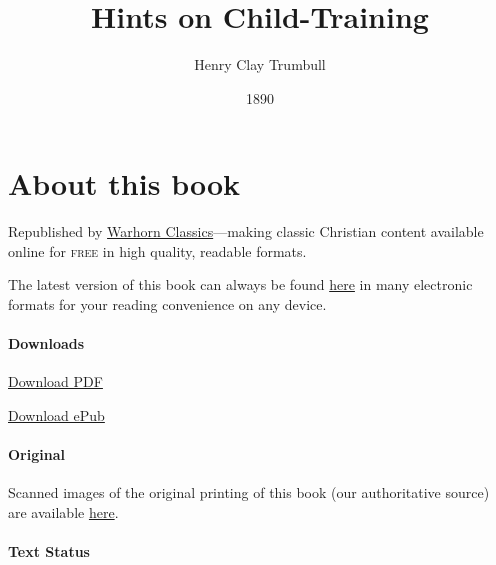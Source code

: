 \documentclass[
]{book}
\title{Hints on Child-Training}
\author{Henry Clay Trumbull}
\date{1890}
\begin{document}
\maketitle

\mainmatter
{}

{
\setcounter{tocdepth}{1}
\tableofcontents
}
\hypertarget{about-this-book}{%
\chapter*{About this book}\label{about-this-book}}

Republished by \href{https://classics.warhornmedia.com/}{Warhorn Classics}---making classic Christian content available online for \textsc{free} in high quality, readable formats.

The latest version of this book can always be found \href{https://warhornmedia.github.io/child-training-trumbull/}{here} in many electronic formats for your reading convenience on any device.

\hypertarget{downloads}{%
\subsubsection*{Downloads}\label{downloads}}

\href{https://warhornmedia.github.io/child-training-trumbull//Trumbull-Hints_on_Child_Training.pdf}{Download PDF}

\href{https://warhornmedia.github.io/child-training-trumbull//Trumbull-Hints_on_Child_Training.epub}{Download ePub}

\hypertarget{original}{%
\subsubsection*{Original}\label{original}}

Scanned images of the original printing of this book (our authoritative source) are available \href{https://archive.org/details/hintsonchildtrai00trum}{here}.

\hypertarget{text-status}{%
\subsubsection*{Text Status}\label{text-status}}
\end{document}
